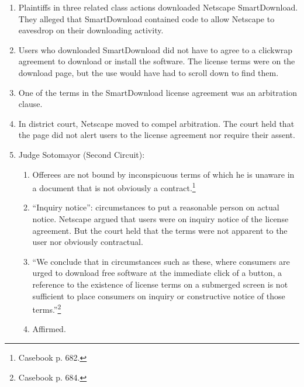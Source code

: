 \begin{enumerate}
    \item Plaintiffs in three related class actions downloaded Netscape 
    SmartDownload. They alleged that SmartDownload contained code to allow 
    Netscape to eavesdrop on their downloading activity.
    \item Users who downloaded SmartDownload did not have to agree to a 
    clickwrap agreement to download or install the software. The license terms 
    were on the download page, but the use would have had to scroll down to 
    find them.
    \item One of the terms in the SmartDownload license agreement was an 
    arbitration clause.
    \item In district court, Netscape moved to compel arbitration. The court 
    held that the page did not alert users to the license agreement nor 
    require their assent.
    \item Judge Sotomayor (Second Circuit):
    \begin{enumerate}
        \item Offerees are not bound by inconspicuous terms of which he is 
        unaware in a document that is not obviously a 
        contract.\footnote{Casebook p. 682.}
        \item ``Inquiry notice'': circumstances to put a reasonable person on 
        actual notice. Netscape argued that users were on inquiry notice of 
        the license agreement. But the court held that the terms were not 
        apparent to the user nor obviously contractual.
        \item ``We conclude that in circumstances such as these, where 
        consumers are urged to download free software at the immediate click 
        of a button, a reference to the existence of license terms on a 
        submerged screen is not sufficient to place consumers on inquiry or 
        constructive notice of those terms.''\footnote{Casebook p. 684.}
        \item Affirmed.
    \end{enumerate}
\end{enumerate}
